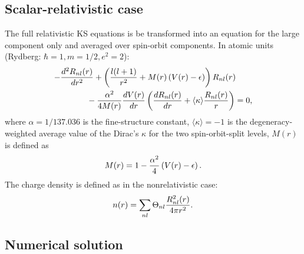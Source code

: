 \subsection{Scalar-relativistic case} 

The full relativistic KS equations
is be transformed into an equation for the large component only
and averaged over spin-orbit components. In atomic units
(Rydberg: $\hbar=1, m=1/2, e^2=2$):
\begin{eqnarray}
-{d^2 R_{nl}(r)\over dr^2}
+\left( {l(l+1)\over r^2} + M(r)\left(V(r)-\epsilon\right)
\right) R_{nl}(r) \qquad \nonumber \\ \mbox{} -
 {\alpha^2\over 4M(r)} {dV(r)\over dr} 
                    \left({dR_{nl}(r)\over dr} +
                          \langle\kappa\rangle {R_{nl}(r)\over r}\right)= 0,
\end{eqnarray}
where $\alpha=1/137.036$ is the fine-structure constant,
$\langle\kappa\rangle=-1$ is the degeneracy-weighted average value 
of the Dirac's $\kappa$ for the two spin-orbit-split levels, $M(r)$ is
defined as
\begin{equation}
M(r)= 1 - {\alpha^2\over 4} \left(V(r)-\epsilon\right).
\end{equation}
The charge density is defined as in the nonrelativistic case:
\begin{equation}
n(r) = \sum_{nl} \Theta_{nl}{R^2_{nl}(r)\over 4\pi r^2}.
\end{equation}

\subsection{Numerical solution} 

